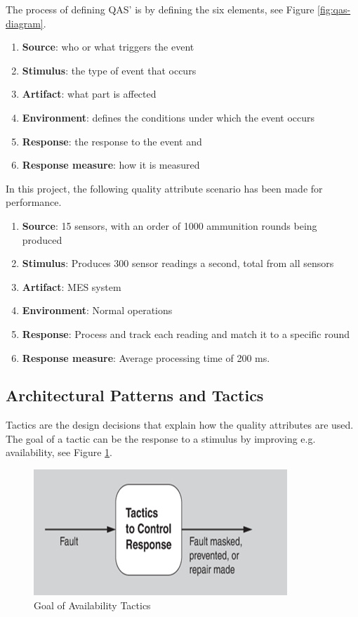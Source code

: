 The process of defining QAS' is by defining the six elements, see Figure \ref{fig:qas-diagram}.

\begin{enumerate}
    \item \textbf{Source}: who or what triggers the event
    \item \textbf{Stimulus}: the type of event that occurs
    \item \textbf{Artifact}: what part is affected
    \item \textbf{Environment}: defines the conditions under which the event occurs
    \item \textbf{Response}: the response to the event and 
    \item \textbf{Response measure}: how it is measured
\end{enumerate}

In this project, the following quality attribute scenario has been made for performance.

\begin{enumerate}
    \item \textbf{Source}: 15 sensors, with an order of 1000 ammunition rounds being produced
    \item \textbf{Stimulus}: Produces 300 sensor readings a second, total from all sensors
    \item \textbf{Artifact}: MES system
    \item \textbf{Environment}: Normal operations
    \item \textbf{Response}: Process and track each reading and match it to a specific round 
    \item \textbf{Response measure}: Average processing time of 200 ms.
\end{enumerate}

\subsection{Architectural Patterns and Tactics}
Tactics are the design decisions that explain how the quality attributes are used. The goal of a tactic can be the response to a stimulus by improving e.g. availability, see Figure \ref{fig:goal-availablity tactics}.
\begin{figure}[H]
    \centering
    \caption{Goal of Availability Tactics}
    \label{fig:goal-availablity tactics}
    \includegraphics[width=0.5\linewidth]{report/GroupTemplate/images/Goal of availability tactics.png}
\end{figure}

